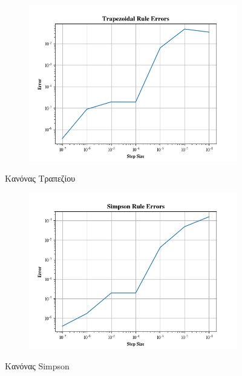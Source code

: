 \documentclass{article}
\begin{document}
\vspace*{\fill}
\begin{figure}[H]	
	\begin{adjustbox}{center}
		\begin{subfigure}[c]{.8\textwidth}    
			\includegraphics[width=1\textwidth,height=\textheight,keepaspectratio]{media/1/Figure_5.png}
		\end{subfigure}%
	\end{adjustbox}
\caption{Κανόνας Τραπεζίου}
\label{(Trapezoidal_Rule)}
\end{figure}

\vspace*{\fill}
\newpage
\begin{figure}[H]
    \centering	
	\begin{adjustbox}{center}
		\begin{subfigure}[c]{.8\textwidth}    
			\includegraphics[width=1\textwidth,height=\textheight,keepaspectratio]{media/1/Figure_7.png}
		\end{subfigure}%
	\end{adjustbox}

\caption{Κανόνας \foreignlanguage{english}{Simpson}}
\label{(Simpson_Rule)}
\end{figure}
\end{document}
